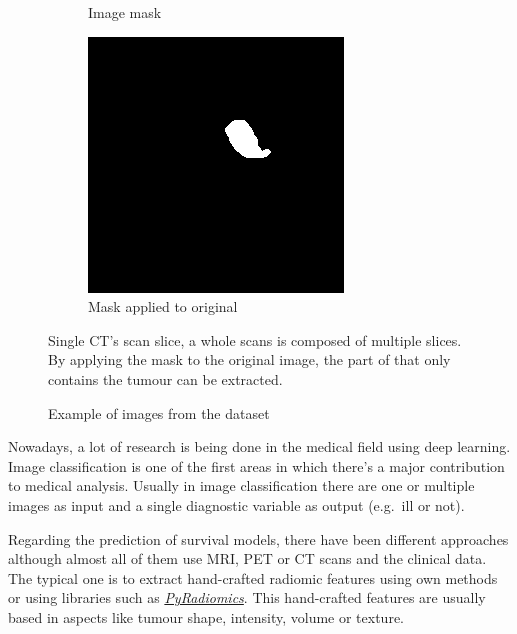 \begin{figure}
\begin{subfigure}[t]{.32\textwidth}
    \caption{Image mask}
  \end{subfigure}
  \hfill
  \begin{subfigure}[t]{.32\textwidth}
    \centering
    \includegraphics[width=\textwidth]{images/IMG_merge_example.png}
    \caption{Mask applied to original}
  \end{subfigure}

  \caption{Example of images from the dataset \label{fig:dataset-example}}

  Single CT's scan slice, a whole scans is composed of multiple slices. By applying the mask to 
  the original image, the part of that only contains the tumour can be extracted.
\end{figure}



Nowadays, a lot of research is being done in the medical field using deep learning. Image
classification is one of the first areas in which there's a major contribution to medical analysis.
Usually in image classification there are one or multiple images as input and a single diagnostic 
variable as output (e.g.~ill or not).
~\cite{medical:survey-deep-learning}

Regarding the prediction of survival models, there have been different approaches although
almost all of them use MRI, PET or CT scans and the clinical data. The typical one is to extract
hand-crafted radiomic features using own methods or using libraries such as
\href{https://github.com/Radiomics/pyradiomics}{\emph{PyRadiomics}}. This hand-crafted 
features are usually based in aspects like tumour shape, intensity, volume or texture.
~\cites{medical:tumour-radiomics}{medical:py-radiomics}

